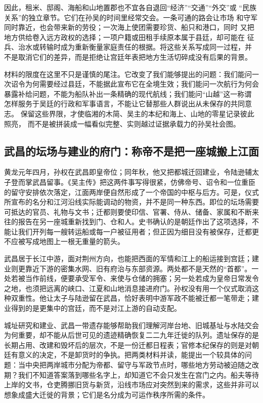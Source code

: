 因此，租米、邸阁、海船和山地置郡也不宜各自退回“经济”“交通”“外交”或
“民族关系”的独立章节。它们在孙吴的时间里经常交会。一条可通的路会让市场
和守军同时靠近，也会带来新的劳役；一次海上使团需要珍货、船只和港口，同时
又把地方供给卷入远方政权的选择；一项户籍或田租手续原本属于县廷，却可能在
征兵、治水或转输时成为重新衡量家庭责任的根据。将这些关系写成同一过程，并
不是取消它们的差异，而是拒绝让宫廷年表把地方生活切碎成没有后果的背景。

材料的限度在这里不只是谨慎的尾注。它改变了我们能够提出的问题：我们能问一
次诏令为何需要经过县廷，不能据此宣布它在全境生效；我们能问一次航行为何会
暴露补给问题，不能为船队补出一条精确的现代航线；我们能问“山越”这一称谓
怎样服务于吴廷的行政和军事语言，不能让它替那些人群说出从未保存的共同意志。
保留这些界限，才使临湘的木简、吴主的本纪和海上、山地的零星记录彼此照亮，
而不是被拼装成一幅看似完整、实则越过证据承载力的孙吴社会图。

\subsection{武昌的坛场与建业的府门：称帝不是把一座城搬上江面}
\label{reader:wu:huanglong-capital}
黄龙元年四月，孙权在武昌即皇帝位；同年秋，他又把都城迁回建业，令陆逊辅太子登而掌武昌留事。《吴主传》把这两件事写得很紧，仿佛帝号、诏令和一位重臣的留守安排依次落定，江面两岸便自然形成了一个帝国的中枢与后方。可是，仪式所宣布的名分和江河沿线实际能调动的物资，并不是同一种东西。即位的坛场需要可抵达的官员、礼物与文书；迁都则要使印信、官署、侍从、储备、家属和不断来往的报告在另一座城重新找到门、仓和人。史书确认的是朝廷作出了这项选择，不能让我们开列每一艘转运船或每一户被征用者；但正因为细目没有被保存，迁都更不应被写成地图上一根无重量的箭头。

武昌居于长江中游，面对荆州方向，也能把西面的军情和江上的船运接到宫廷；建业则更靠近下游的密集水网、旧有府治与东部资源。两处都不是天然的“首都”。一处若被当作前线，便要承受军令、来使与仓储的拥塞；另一处若成为皇帝日常发令之地，也须把远离的峡口、江夏和山地消息接进府门。孙权没有用一个仪式取消这种双重性。他让太子与陆逊留在武昌，恰好表明中游军政不能被迁都一笔带走；建业得到的是更集中的宫廷，而不是对江上游的自动支配。

城址研究和建业、武昌一带遗存能够帮助我们理解河岸台地、旧城基址与水陆交会为何重要，却不能从后世可见的遗迹精确恢复二二九年迁徙的队列。遗址保存的是长期占用、改建和毁坏后的层次，不是一份迁都日程表；官修本纪保存的则是对朝廷有意义的决定，不是卸货时的争执。把两类材料并读，能提出一个较具体的问题：当中央把两岸城市分配为帝都、留守与军政节点时，哪些地方劳动被迫随之改期？我们不知道答案落到哪些名字上，却知道它不会只发生在宫门之内。船夫等待上岸的文书，仓吏腾挪旧货与新货，沿线市场应对突然到来的需求，这些并非可以想象成盛大迁徙的背景；它们是名分成为可运作秩序所需的条件。

